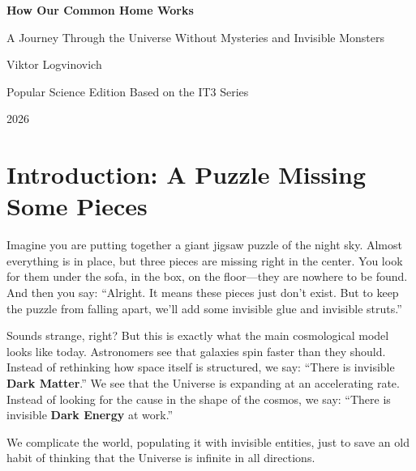 \documentclass[12pt,a4paper,oneside]{book}
\begin{document}
\begin{titlepage}
    \centering
    \vspace*{2cm}
    {\Huge\bfseries How Our Common Home Works\par}
    \vspace{0.5cm}
    {\Large A Journey Through the Universe Without Mysteries and Invisible Monsters\par}
    \vspace{2cm}
    {\Large Viktor Logvinovich\par}
    \vfill
    {\large Popular Science Edition Based on the IT3 Series\par}
    \vspace{1cm}
    {2026\par}
\end{titlepage}

\frontmatter
\tableofcontents

\chapter*{Introduction: A Puzzle Missing Some Pieces}

Imagine you are putting together a giant jigsaw puzzle of the night sky. Almost everything is in place, but three pieces are missing right in the center. You look for them under the sofa, in the box, on the floor—they are nowhere to be found. And then you say: “Alright. It means these pieces just don't exist. But to keep the puzzle from falling apart, we'll add some invisible glue and invisible struts.”

Sounds strange, right? But this is exactly what the main cosmological model looks like today. Astronomers see that galaxies spin faster than they should. Instead of rethinking how space itself is structured, we say: “There is invisible \textbf{Dark Matter}.” We see that the Universe is expanding at an accelerating rate. Instead of looking for the cause in the shape of the cosmos, we say: “There is invisible \textbf{Dark Energy} at work.”

We complicate the world, populating it with invisible entities, just to save an old habit of thinking that the Universe is infinite in all directions.
\end{document}
